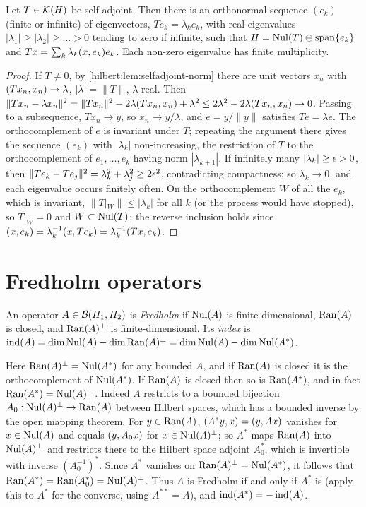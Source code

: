 \begin{theorem}\label{hilbert:thm:spectral}
Let $T\in\mathcal{K}(H)$ be self-adjoint. Then there is an orthonormal sequence $(e_k)$ (finite
or infinite) of eigenvectors, $Te_k=\lambda_ke_k$, with real eigenvalues
$|\lambda_1|\ge|\lambda_2|\ge\dots>0$ tending to zero if infinite, such that
$H=\operatorname{Nul}(T)\oplus\overline{\operatorname{span}}\{e_k\}$ and $Tx=\sum_k\lambda_k( x, e_k)e_k$.
Each non-zero eigenvalue has finite multiplicity.
\end{theorem}
\begin{proof}
If $T\ne0$, by \cref{hilbert:lem:selfadjoint-norm} there are unit vectors $x_n$ with
$( Tx_n, x_n)\to\lambda$, $|\lambda|=\|T\|$, $\lambda$ real. Then
$\|Tx_n-\lambda x_n\|^2=\|Tx_n\|^2-2\lambda( Tx_n, x_n)+\lambda^2\le2\lambda^2-2\lambda( Tx_n, x_n)\to0$.
Passing to a subsequence, $Tx_n\to y$, so $x_n\to y/\lambda$, and $e=y/\|y\|$ satisfies $Te=\lambda e$.
The orthocomplement of $e$ is invariant under $T$; repeating the argument there gives the
sequence $(e_k)$ with $|\lambda_k|$ non-increasing, the restriction of $T$ to the orthocomplement
of $e_1,\dots,e_k$ having norm $|\lambda_{k+1}|$. If infinitely many $|\lambda_k|\ge\epsilon>0$, then
$\|Te_k-Te_j\|^2=\lambda_k^2+\lambda_j^2\ge2\epsilon^2$, contradicting compactness; so $\lambda_k\to0$, and each
eigenvalue occurs finitely often. On the orthocomplement $W$ of all the $e_k$, which is
invariant, $\|T|_W\|\le|\lambda_k|$ for all $k$ (or the process would have stopped), so
$T|_W=0$ and $W\subset\operatorname{Nul}(T)$; the reverse inclusion holds since
$( x, e_k)=\lambda_k^{-1}( x, Te_k)=\lambda_k^{-1}( Tx, e_k)$.
\end{proof}

\section{Fredholm operators}\label{hilbert:sec:fredholm}

\begin{definition}\label{hilbert:def:fredholm}
An operator $A\in\mathcal{B}(H_1,H_2)$ is \emph{Fredholm} if $\operatorname{Nul}(A)$ is finite-dimensional,
$\operatorname{Ran}(A)$ is closed, and $\operatorname{Ran}(A)^\perp$ is finite-dimensional. Its \emph{index} is
$\operatorname{ind}(A)=\dim\operatorname{Nul}(A)-\dim\operatorname{Ran}(A)^\perp=\dim\operatorname{Nul}(A)-\dim\operatorname{Nul}(A^*)$.
\end{definition}

Here $\operatorname{Ran}(A)^\perp=\operatorname{Nul}(A^*)$ for any bounded $A$, and if $\operatorname{Ran}(A)$ is closed it is the
orthocomplement of $\operatorname{Nul}(A^*)$. If $\operatorname{Ran}(A)$ is closed then so is $\operatorname{Ran}(A^*)$, and in fact
$\operatorname{Ran}(A^*)=\operatorname{Nul}(A)^\perp$. Indeed $A$ restricts to a bounded bijection
$A_0:\operatorname{Nul}(A)^\perp\to\operatorname{Ran}(A)$ between Hilbert spaces, which has a bounded inverse by the open
mapping theorem. For $y\in\operatorname{Ran}(A)$, $( A^*y, x)=( y, Ax)$ vanishes for $x\in\operatorname{Nul}(A)$ and
equals $( y, A_0x)$ for $x\in\operatorname{Nul}(A)^\perp$; so $A^*$ maps $\operatorname{Ran}(A)$ into $\operatorname{Nul}(A)^\perp$ and
restricts there to the Hilbert space adjoint $A_0^*$, which is invertible with inverse
$(A_0^{-1})^*$. Since $A^*$ vanishes on $\operatorname{Ran}(A)^\perp=\operatorname{Nul}(A^*)$, it follows that
$\operatorname{Ran}(A^*)=\operatorname{Ran}(A_0^*)=\operatorname{Nul}(A)^\perp$. Thus $A$ is Fredholm if and only if $A^*$ is (apply this
to $A^*$ for the converse, using $A^{**}=A$), and $\operatorname{ind}(A^*)=-\operatorname{ind}(A)$.

